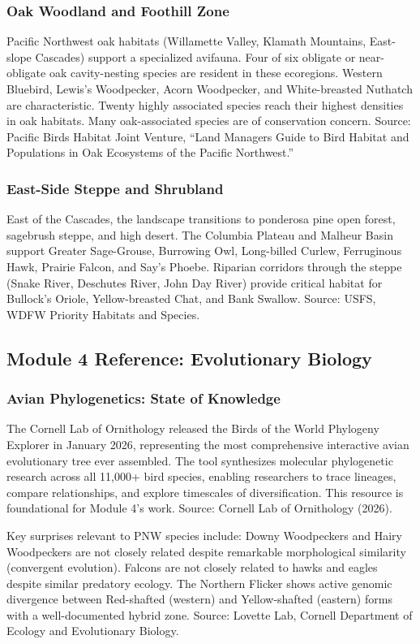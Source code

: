 \documentclass[11pt,letterpaper]{article}
\begin{document}
\subsubsection{Oak Woodland and Foothill Zone}
Pacific Northwest oak habitats (Willamette Valley, Klamath Mountains, East-slope Cascades) support a specialized avifauna. Four of six obligate or near-obligate oak cavity-nesting species are resident in these ecoregions. Western Bluebird, Lewis's Woodpecker, Acorn Woodpecker, and White-breasted Nuthatch are characteristic. Twenty highly associated species reach their highest densities in oak habitats. Many oak-associated species are of conservation concern. Source: Pacific Birds Habitat Joint Venture, ``Land Managers Guide to Bird Habitat and Populations in Oak Ecosystems of the Pacific Northwest.''

\subsubsection{East-Side Steppe and Shrubland}
East of the Cascades, the landscape transitions to ponderosa pine open forest, sagebrush steppe, and high desert. The Columbia Plateau and Malheur Basin support Greater Sage-Grouse, Burrowing Owl, Long-billed Curlew, Ferruginous Hawk, Prairie Falcon, and Say's Phoebe. Riparian corridors through the steppe (Snake River, Deschutes River, John Day River) provide critical habitat for Bullock's Oriole, Yellow-breasted Chat, and Bank Swallow. Source: USFS, WDFW Priority Habitats and Species.

\subsection{Module 4 Reference: Evolutionary Biology}

\subsubsection{Avian Phylogenetics: State of Knowledge}
The Cornell Lab of Ornithology released the Birds of the World Phylogeny Explorer in January 2026, representing the most comprehensive interactive avian evolutionary tree ever assembled. The tool synthesizes molecular phylogenetic research across all 11,000+ bird species, enabling researchers to trace lineages, compare relationships, and explore timescales of diversification. This resource is foundational for Module 4's work. Source: Cornell Lab of Ornithology (2026).

Key surprises relevant to PNW species include: Downy Woodpeckers and Hairy Woodpeckers are not closely related despite remarkable morphological similarity (convergent evolution). Falcons are not closely related to hawks and eagles despite similar predatory ecology. The Northern Flicker shows active genomic divergence between Red-shafted (western) and Yellow-shafted (eastern) forms with a well-documented hybrid zone. Source: Lovette Lab, Cornell Department of Ecology and Evolutionary Biology.
\end{document}
